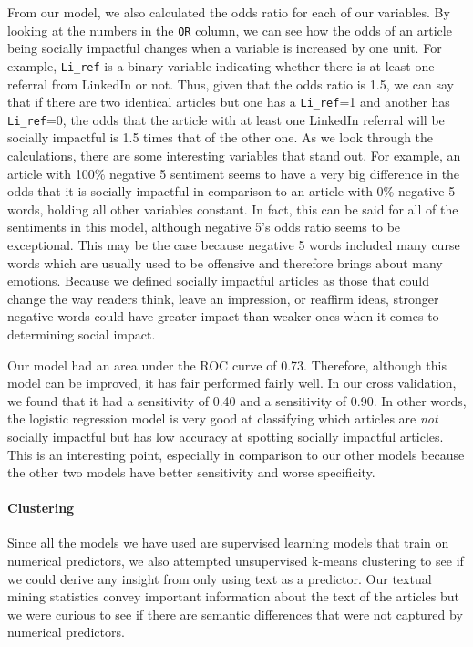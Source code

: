\documentclass[10pt,letterpaper]{article}
\begin{document}
From our model, we also calculated the odds ratio for each of our
variables. By looking at the numbers in the \texttt{OR} column, we can
see how the odds of an article being socially impactful changes when a
variable is increased by one unit. For example, \texttt{Li\_ref} is a
binary variable indicating whether there is at least one referral from
LinkedIn or not. Thus, given that the odds ratio is 1.5, we can say that
if there are two identical articles but one has a \texttt{Li\_ref}=1 and
another has \texttt{Li\_ref}=0, the odds that the article with at least
one LinkedIn referral will be socially impactful is 1.5 times that of
the other one. As we look through the calculations, there are some
interesting variables that stand out. For example, an article with 100\%
negative 5 sentiment seems to have a very big difference in the odds
that it is socially impactful in comparison to an article with 0\%
negative 5 words, holding all other variables constant. In fact, this
can be said for all of the sentiments in this model, although negative
5's odds ratio seems to be exceptional. This may be the case because
negative 5 words included many curse words which are usually used to be
offensive and therefore brings about many emotions. Because we defined
socially impactful articles as those that could change the way readers
think, leave an impression, or reaffirm ideas, stronger negative words
could have greater impact than weaker ones when it comes to determining
social impact.

Our model had an area under the ROC curve of 0.73. Therefore, although
this model can be improved, it has fair performed fairly well. In our
cross validation, we found that it had a sensitivity of 0.40 and a
sensitivity of 0.90. In other words, the logistic regression model is
very good at classifying which articles are \emph{not} socially
impactful but has low accuracy at spotting socially impactful articles.
This is an interesting point, especially in comparison to our other
models because the other two models have better sensitivity and worse
specificity.

\hypertarget{clustering}{%
\paragraph{Clustering}\label{clustering}}

Since all the models we have used are supervised learning models that
train on numerical predictors, we also attempted unsupervised k-means
clustering to see if we could derive any insight from only using text as
a predictor. Our textual mining statistics convey important information
about the text of the articles but we were curious to see if there are
semantic differences that were not captured by numerical predictors.
\end{document}
